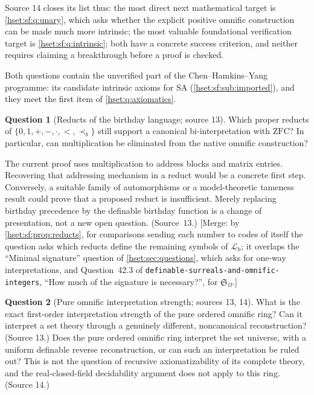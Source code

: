 \documentclass[11pt,letterpaper]{article}
\theoremstyle{definition}
\newtheorem{question}[question]{Question}\aliascntresetthe{question}
\theoremstyle{remark}
\newcommand{\ZFC}{\mathrm{ZFC}}
\newcommand{\repo}[1]{\nolinkurl{#1}}
\newcommand{\SAth}{\mathrm{SA}}
\newcommand{\precb}{\prec_b}
\newcommand{\Lb}{\mathcal L_{\mathrm b}}
\begin{document}
Source 14 closes its list thus: the most direct next mathematical target is
\cref{hset:sf:q:unary}, which asks whether the explicit positive omnific construction
can be made much more intrinsic; the most valuable foundational verification target
is \cref{hset:sf:q:intrinsic}; both have a concrete success criterion, and neither
requires claiming a breakthrough before a proof is checked.

Both questions contain the unverified part of the Chen--Hamkins--Yang programme: its
candidate intrinsic axioms for $\SAth$ (\cref{hset:sf:sub:imported}), and they meet
the first item of \cref{hset:q:axiomatics}.

\begin{question}[Reducts of the birthday language; source 13]\label{hset:sf:q:reducts}
Which proper reducts of $\{0,1,+,-,\cdot,<,\precb\}$ still support a canonical
bi-interpretation with $\ZFC$? In particular, can multiplication be eliminated from
the native omnific construction?
\end{question}

The current proof uses multiplication to address blocks and matrix entries.
Recovering that addressing mechanism in a reduct would be a concrete first step.
Conversely, a suitable family of automorphisms or a model-theoretic tameness result
could prove that a proposed reduct is insufficient. Merely replacing birthday
precedence by the definable birthday function is a change of presentation, not a new
open question. (Source~13.) [Merge: by \cref{hset:sf:prop:reducts}, for comparisons
sending each number to codes of itself the question asks which reducts define the
remaining symbols of $\Lb$; it overlaps the ``Minimal signature'' question of
\cref{hset:sec:questions}, which asks for one-way interpretations, and Question~42.3 of
\repo{definable-surreals-and-omnific-integers}, ``How much of the signature is
necessary?'', for $\mathfrak S_\Omega$.]

\begin{question}[Pure omnific interpretation strength; sources 13, 14]\label{hset:sf:q:pureoz}
What is the exact first-order interpretation strength of the pure ordered omnific
ring? Can it interpret a set theory through a genuinely different, noncanonical
reconstruction? (Source 13.) Does the pure ordered omnific ring interpret the set
universe, with a uniform definable reverse reconstruction, or can such an
interpretation be ruled out? This is not the question of recursive axiomatizability
of its complete theory, and the real-closed-field decidability argument does not
apply to this ring. (Source 14.)
\end{question}
\end{document}
